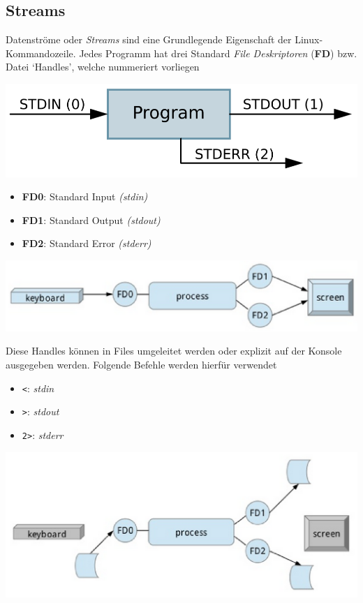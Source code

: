 \documentclass[
  9pt,
  a4paperpaper,
  DIV=11]{scrartcl}
\providecommand{\tightlist}{%
  \setlength{\itemsep}{0pt}\setlength{\parskip}{0pt}}\usepackage{longtable,booktabs,array}
\numberwithin{equation}{section}
\begin{document}
\begin{multicols}{2}
\begin{tcolorbox}
\begin{tcolorbox}
\begin{tcolorbox}
\begin{tcolorbox}
\begin{tcolorbox}
\begin{tcolorbox}
\hypertarget{streams-1}{%
\subsection{Streams}\label{streams-1}}

Datenströme oder \emph{Streams} sind eine Grundlegende Eigenschaft der
Linux-Kommandozeile. Jedes Programm hat drei Standard \emph{File
Deskriptoren} (\textbf{FD}) bzw. Datei `Handles', welche nummeriert
vorliegen

\includegraphics{images/StandardIO_Redirection.png}

\begin{itemize}
\tightlist
\item
  \textbf{FD0}: Standard Input \emph{(stdin)}
\item
  \textbf{FD1}: Standard Output \emph{(stdout)}
\item
  \textbf{FD2}: Standard Error \emph{(stderr)}
\end{itemize}

\includegraphics{images/StandardIO_Overview.png}

Diese Handles können in Files umgeleitet werden oder explizit auf der
Konsole ausgegeben werden. Folgende Befehle werden hierfür verwendet

\begin{itemize}
\tightlist
\item
  \texttt{\textless{}}: \emph{stdin}
\item
  \texttt{\textgreater{}}: \emph{stdout}
\item
  \texttt{2\textgreater{}}: \emph{stderr}
\end{itemize}

\includegraphics{images/RedirectedFileHandle.png}


\end{tcolorbox}
\end{tcolorbox}
\end{tcolorbox}
\end{tcolorbox}
\end{tcolorbox}
\end{tcolorbox}
\end{multicols}
\end{document}
